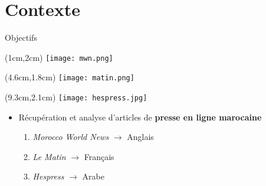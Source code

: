 \documentclass[10pt,sans,usenames,dvipsnames,english,compress]{beamer}
\begin{document}
\section{Contexte}
\begin{frame}{Objectifs}
        \begin{textblock*}{3cm}(1cm,2cm)
		\texttt{[image: mwn.png]}
	\end{textblock*}

	\begin{textblock*}{3cm}(4.6cm,1.8cm)
		\texttt{[image: matin.png]}
	\end{textblock*}

        \begin{textblock*}{3cm}(9.3cm,2.1cm)
		\texttt{[image: hespress.jpg]}
	\end{textblock*}

        \vspace{1.5cm}

	\begin{itemize}
		\item Récupération et analyse d'articles de \textbf{presse en ligne marocaine}
            \vspace{0.3cm}
            \begin{enumerate}
                \item \normalsize{\emph{Morocco World News} $\rightarrow$ Anglais}
                \item \normalsize{\emph{Le Matin} $\rightarrow$ Français}
                \item \normalsize{\emph{Hespress} $\rightarrow$ Arabe}
            \end{enumerate}
        \end{itemize}
\end{frame}
\end{document}
